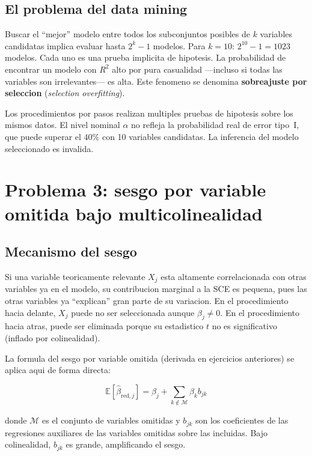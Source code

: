 \documentclass[12pt, letterpaper]{article}
\theoremstyle{remark}
\newcommand{\E}{\mathbb{E}}
\begin{document}
\subsection{El problema del data mining}

Buscar el ``mejor'' modelo entre todos los subconjuntos posibles de $k$
variables candidatas implica evaluar hasta $2^k - 1$ modelos. Para $k = 10$:
$2^{10} - 1 = 1023$ modelos. Cada uno es una prueba implicita de hipotesis.
La probabilidad de encontrar un modelo con $R^2$ alto por pura casualidad
—incluso si todas las variables son irrelevantes— es alta. Este fenomeno
se denomina \textbf{sobreajuste por seleccion} (\textit{selection overfitting}).

\begin{clave}
  Los procedimientos por pasos realizan multiples pruebas de hipotesis sobre
  los mismos datos. El nivel nominal $\alpha$ no refleja la probabilidad real
  de error tipo~I, que puede superar el $40\%$ con 10 variables candidatas.
  La inferencia del modelo seleccionado es invalida.
\end{clave}

\section{Problema 3: sesgo por variable omitida bajo multicolinealidad}

\subsection{Mecanismo del sesgo}

Si una variable teoricamente relevante $X_j$ esta altamente correlacionada
con otras variables ya en el modelo, su contribucion marginal a la SCE es
pequena, pues las otras variables ya ``explican'' gran parte de su variacion.
En el procedimiento hacia delante, $X_j$ puede no ser seleccionada aunque
$\beta_j \neq 0$. En el procedimiento hacia atras, puede ser eliminada
porque su estadistico $t$ no es significativo (inflado por colinealidad).

La formula del sesgo por variable omitida (derivada en ejercicios anteriores)
se aplica aqui de forma directa:

\begin{equation}
  \E[\hat\beta_{\text{red},j}] = \beta_j + \sum_{k \notin \mathcal{M}} \beta_k b_{jk}
  \label{eq:sesgo_omision}
\end{equation}

donde $\mathcal{M}$ es el conjunto de variables omitidas y $b_{jk}$ son los
coeficientes de las regresiones auxiliares de las variables omitidas sobre
las incluidas. Bajo colinealidad, $b_{jk}$ es grande, amplificando el sesgo.
\end{document}
